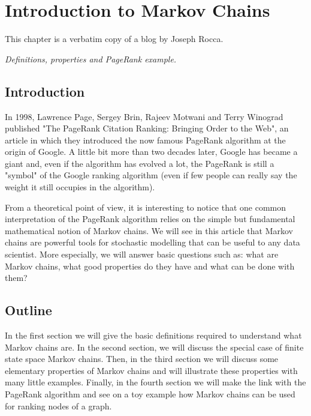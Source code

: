 
\chapter{Introduction to Markov Chains}
\label{chap:IntroductiontoMarkovChains}

This chapter is a verbatim copy of a blog \cite{JosephRoccaMarkovChains2019} by Joseph Rocca.


\textit{Definitions, properties and PageRank example.}

\section{Introduction}

In 1998, Lawrence Page, Sergey Brin, Rajeev Motwani and Terry Winograd published "The PageRank Citation Ranking: Bringing Order to the Web", an article in which they introduced the now famous PageRank algorithm at the origin of Google. A little bit more than two decades later, Google has became a giant and, even if the algorithm has evolved a lot, the PageRank is still a "symbol" of the Google ranking algorithm (even if few people can really say the weight it still occupies in the algorithm).

From a theoretical point of view, it is interesting to notice that one common interpretation of the PageRank algorithm relies on the simple but fundamental mathematical notion of Markov chains. We will see in this article that Markov chains are powerful tools for stochastic modelling that can be useful to any data scientist. More especially, we will answer basic questions such as: what are Markov chains, what good properties do they have and what can be done with them?

\section{Outline}
In the first section we will give the basic definitions required to understand what Markov chains are. In the second section, we will discuss the special case of finite state space Markov chains. Then, in the third section we will discuss some elementary properties of Markov chains and will illustrate these properties with many little examples. Finally, in the fourth section we will make the link with the PageRank algorithm and see on a toy example how Markov chains can be used for ranking nodes of a graph.

